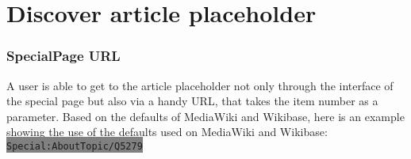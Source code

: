 \section{Discover article placeholder}
\subsubsection{SpecialPage URL}
A user is able to get to the article placeholder not only through the interface of the special page but also via a handy URL, that takes the item number as a parameter. Based on the defaults of MediaWiki and Wikibase, here is an example showing the use of the defaults used on MediaWiki and Wikibase: \colorbox{Gray}{\lstinline[basicstyle=\ttfamily\color{white}]|Special:AboutTopic/Q5279|}  \\

